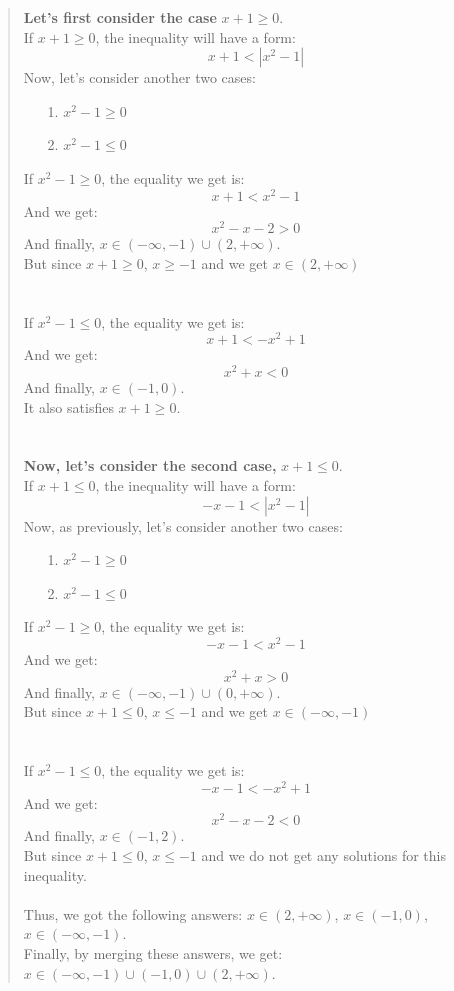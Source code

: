 \documentclass[12pt, a4paper]{article}                      %
\begin{document}
\begin{itemize}
\begin{quote}
\textbf{Let's first consider the case} $x + 1 \geq 0$.\\
If $x + 1 \geq 0$, the inequality will have a form:
$$x + 1 < |x^2 - 1|$$
Now, let's consider another two cases:
\begin{itemize}
\item[1.]
$x^2 - 1 \geq 0$
\item[2.]
$x^2 - 1 \leq 0$
\\
\end{itemize}
If $x^2 - 1 \geq 0$, the equality we get is:\\
$$x + 1 < x^2 - 1$$
And we get:
$$x^2 - x - 2 > 0$$
And finally, $x \in (-\infty, -1) \cup (2, +\infty)$.\\
But since $x + 1 \geq 0$, $x \geq -1$ and we get $x \in (2, +\infty)$
\\\\\\
If $x^2 - 1 \leq 0$, the equality we get is:\\
$$x + 1 < -x^2 + 1$$
And we get:
$$x^2 + x < 0$$
And finally, $x \in (-1, 0)$.\\
It also satisfies $x + 1 \geq 0$.
\\\\\\
\textbf{Now, let's consider the second case,} $x + 1 \leq 0$.\\
If $x + 1 \leq 0$, the inequality will have a form:
$$-x - 1 < |x^2 - 1|$$
Now, as previously, let's consider another two cases:
\begin{itemize}
\item[1.]
$x^2 - 1 \geq 0$
\item[2.]
$x^2 - 1 \leq 0$
\\
\end{itemize}
If $x^2 - 1 \geq 0$, the equality we get is:\\
$$-x - 1 < x^2 - 1$$
And we get:
$$x^2 + x > 0$$
And finally, $x \in (-\infty, -1) \cup (0, +\infty)$.\\
But since $x + 1 \leq 0$, $x \leq -1$ and we get $x \in (-\infty, -1)$
\\\\\\
If $x^2 - 1 \leq 0$, the equality we get is:\\
$$-x - 1 < -x^2 + 1$$
And we get:
$$x^2 - x -2 < 0$$
And finally, $x \in (-1, 2)$.\\
But since $x + 1 \leq 0$, $x \leq -1$ and we do not get any solutions for this inequality.
\\\\
Thus, we got the following answers: $x \in (2, +\infty)$, $x \in (-1, 0)$, $x \in (-\infty, -1)$.\\
Finally, by merging these answers, we get: $x \in (-\infty, -1) \cup (-1,0) \cup (2, +\infty)$.


\end{quote}
\end{itemize}
\end{document}
